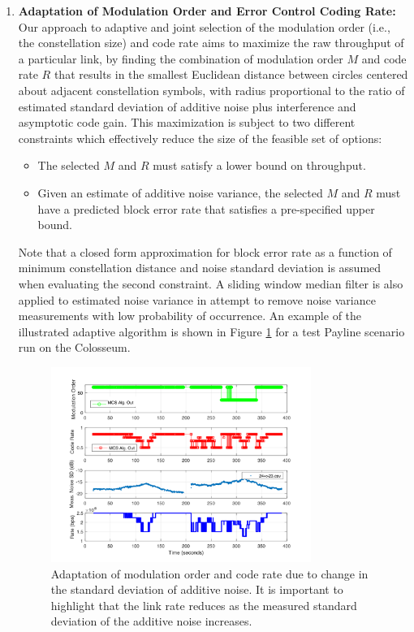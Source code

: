 \documentclass[11pt]{article}
\begin{document}
\begin{enumerate}
     \item \textbf{Adaptation of Modulation Order and Error Control Coding Rate:}
     Our approach to adaptive and joint selection of the modulation order (i.e., the constellation size) and code rate aims to maximize the raw throughput of a particular link, by finding the combination of modulation order $M$ and code rate $R$ that results in the smallest Euclidean distance between circles centered about adjacent constellation symbols, with radius proportional to the ratio of estimated standard deviation of additive noise plus interference and asymptotic code gain.  This maximization is subject to two different constraints which effectively reduce the size of the feasible set of options:
     \begin{itemize}
         \item The selected $M$ and $R$ must satisfy a lower bound on throughput.
         \item Given an estimate of additive noise variance, the selected $M$ and $R$ must have a predicted block error rate that satisfies a pre-specified upper bound.
     \end{itemize}
     Note that a closed form approximation for block error rate as a function of minimum constellation distance and noise standard deviation is assumed when evaluating the second constraint.  A sliding window median filter is also applied to estimated noise variance in attempt to remove noise variance measurements with low probability of occurrence.  An example of the illustrated adaptive algorithm is shown in Figure \ref{fg:MCS} for a test Payline scenario run on the Colosseum.
     \begin{figure} [htb]
     \centerline{
     \includegraphics[width = 0.8\textwidth]{Figures/MCS.png}}
     \caption{Adaptation of modulation order and code rate due to change in the standard deviation of additive noise.  It is important to highlight that the link rate reduces as the measured standard deviation of the additive noise increases.}
     \label{fg:MCS}
     \end{figure}
     

\end{enumerate}
\end{document}
